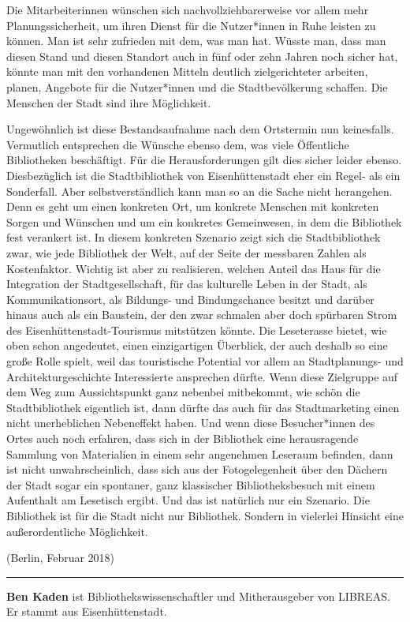 \documentclass[a4paper,
fontsize=11pt,
oneside,
numbers=noperiodatend,
parskip=half-,
bibliography=totoc,
final
]{scrartcl}
\begin{document}
Die Mitarbeiterinnen wünschen sich nachvollziehbarerweise vor allem mehr
Planungssicherheit, um ihren Dienst für die Nutzer*innen in Ruhe leisten
zu können. Man ist sehr zufrieden mit dem, was man hat. Wüsste man, dass
man diesen Stand und diesen Standort auch in fünf oder zehn Jahren noch
sicher hat, könnte man mit den vorhandenen Mitteln deutlich
zielgerichteter arbeiten, planen, Angebote für die Nutzer*innen und die
Stadtbevölkerung schaffen. Die Menschen der Stadt sind ihre Möglichkeit.

Ungewöhnlich ist diese Bestandsaufnahme nach dem Ortstermin nun
keinesfalls. Vermutlich entsprechen die Wünsche ebenso dem, was viele
Öffentliche Bibliotheken beschäftigt. Für die Herausforderungen gilt
dies sicher leider ebenso. Diesbezüglich ist die Stadtbibliothek von
Eisenhüttenstadt eher ein Regel- als ein Sonderfall. Aber
selbstverständlich kann man so an die Sache nicht herangehen. Denn es
geht um einen konkreten Ort, um konkrete Menschen mit konkreten Sorgen
und Wünschen und um ein konkretes Gemeinwesen, in dem die Bibliothek
fest verankert ist. In diesem konkreten Szenario zeigt sich die
Stadtbibliothek zwar, wie jede Bibliothek der Welt, auf der Seite der
messbaren Zahlen als Kostenfaktor. Wichtig ist aber zu realisieren,
welchen Anteil das Haus für die Integration der Stadtgesellschaft, für
das kulturelle Leben in der Stadt, als Kommunikationsort, als Bildungs-
und Bindungschance besitzt und darüber hinaus auch als ein Baustein, der
den zwar schmalen aber doch spürbaren Strom des
Eisenhüttenstadt-Tourismus mitstützen könnte. Die Leseterasse bietet,
wie oben schon angedeutet, einen einzigartigen Überblick, der auch
deshalb so eine große Rolle spielt, weil das touristische Potential vor
allem an Stadtplanungs- und Architekturgeschichte Interessierte
ansprechen dürfte. Wenn diese Zielgruppe auf dem Weg zum Aussichtspunkt
ganz nebenbei mitbekommt, wie schön die Stadtbibliothek eigentlich ist,
dann dürfte das auch für das Stadtmarketing einen nicht unerheblichen
Nebeneffekt haben. Und wenn diese Besucher*innen des Ortes auch noch
erfahren, dass sich in der Bibliothek eine herausragende Sammlung von
Materialien in einem sehr angenehmen Leseraum befinden, dann ist nicht
unwahrscheinlich, dass sich aus der Fotogelegenheit über den Dächern der
Stadt sogar ein spontaner, ganz klassischer Bibliotheksbesuch mit einem
Aufenthalt am Lesetisch ergibt. Und das ist natürlich nur ein Szenario.
Die Bibliothek ist für die Stadt nicht nur Bibliothek. Sondern in
vielerlei Hinsicht eine außerordentliche Möglichkeit.

(Berlin, Februar 2018)

\begin{center}\rule{0.5\linewidth}{\linethickness}\end{center}

\textbf{Ben Kaden} ist Bibliothekswissenschaftler und Mitherausgeber von
LIBREAS. Er stammt aus Eisenhüttenstadt.
\end{document}
